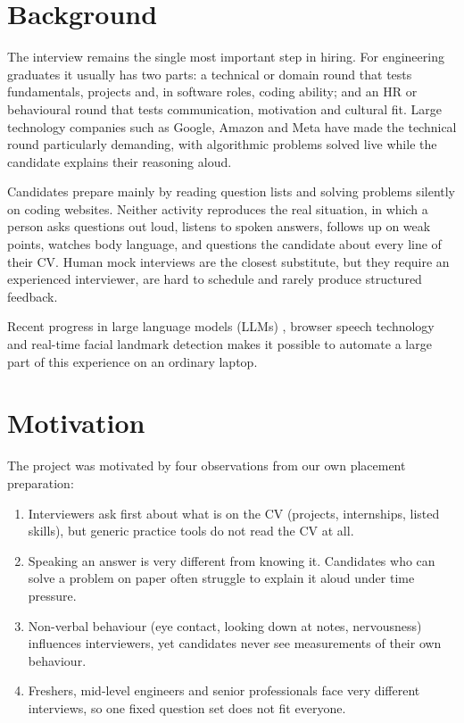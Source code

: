 \documentclass[12pt,a4paper,oneside]{report}
\begin{document}
\section{Background}
The interview remains the single most important step in hiring. For engineering graduates it usually has two parts: a technical or domain round that tests fundamentals, projects and, in software roles, coding ability; and an HR or behavioural round that tests communication, motivation and cultural fit. Large technology companies such as Google, Amazon and Meta have made the technical round particularly demanding, with algorithmic problems solved live while the candidate explains their reasoning aloud.

Candidates prepare mainly by reading question lists and solving problems silently on coding websites. Neither activity reproduces the real situation, in which a person asks questions out loud, listens to spoken answers, follows up on weak points, watches body language, and questions the candidate about every line of their CV. Human mock interviews are the closest substitute, but they require an experienced interviewer, are hard to schedule and rarely produce structured feedback.

Recent progress in large language models (LLMs) \cite{vaswani2017,brown2020,gemini2023}, browser speech technology \cite{webspeech} and real-time facial landmark detection \cite{lugaresi2019,kartynnik2019} makes it possible to automate a large part of this experience on an ordinary laptop.

\section{Motivation}
The project was motivated by four observations from our own placement preparation:
\begin{enumerate}
  \item Interviewers ask first about what is on the CV (projects, internships, listed skills), but generic practice tools do not read the CV at all.
  \item Speaking an answer is very different from knowing it. Candidates who can solve a problem on paper often struggle to explain it aloud under time pressure.
  \item Non-verbal behaviour (eye contact, looking down at notes, nervousness) influences interviewers, yet candidates never see measurements of their own behaviour.
  \item Freshers, mid-level engineers and senior professionals face very different interviews, so one fixed question set does not fit everyone.
\end{enumerate}
\end{document}
